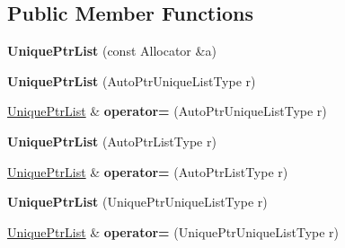 \subsection*{Public Member Functions}
\begin{DoxyCompactItemize}
\item 
\hypertarget{classcore_1_1container_1_1_unique_ptr_list_af3d18e1eafbccc21193aff3a68156da0}{{\bfseries Unique\-Ptr\-List} (const Allocator \&a)}\label{classcore_1_1container_1_1_unique_ptr_list_af3d18e1eafbccc21193aff3a68156da0}

\item 
\hypertarget{classcore_1_1container_1_1_unique_ptr_list_aa03ac532d98bb1c78ba2aa2689ce77e5}{{\bfseries Unique\-Ptr\-List} (Auto\-Ptr\-Unique\-List\-Type r)}\label{classcore_1_1container_1_1_unique_ptr_list_aa03ac532d98bb1c78ba2aa2689ce77e5}

\item 
\hypertarget{classcore_1_1container_1_1_unique_ptr_list_a58841c5438a0f43ba6cf94e84911be23}{\hyperlink{classcore_1_1container_1_1_unique_ptr_list}{Unique\-Ptr\-List} \& {\bfseries operator=} (Auto\-Ptr\-Unique\-List\-Type r)}\label{classcore_1_1container_1_1_unique_ptr_list_a58841c5438a0f43ba6cf94e84911be23}

\item 
\hypertarget{classcore_1_1container_1_1_unique_ptr_list_ace118e65e0fb3ab8847f5f22eb43e4c1}{{\bfseries Unique\-Ptr\-List} (Auto\-Ptr\-List\-Type r)}\label{classcore_1_1container_1_1_unique_ptr_list_ace118e65e0fb3ab8847f5f22eb43e4c1}

\item 
\hypertarget{classcore_1_1container_1_1_unique_ptr_list_a5e57ab0d14185d4cc6e004b3c829a4e7}{\hyperlink{classcore_1_1container_1_1_unique_ptr_list}{Unique\-Ptr\-List} \& {\bfseries operator=} (Auto\-Ptr\-List\-Type r)}\label{classcore_1_1container_1_1_unique_ptr_list_a5e57ab0d14185d4cc6e004b3c829a4e7}

\item 
\hypertarget{classcore_1_1container_1_1_unique_ptr_list_aa1594f0772a08d6d430a1b08992e385b}{{\bfseries Unique\-Ptr\-List} (Unique\-Ptr\-Unique\-List\-Type r)}\label{classcore_1_1container_1_1_unique_ptr_list_aa1594f0772a08d6d430a1b08992e385b}

\item 
\hypertarget{classcore_1_1container_1_1_unique_ptr_list_a29a1d4f32c1dd4daa89d5f48ea8b2b8a}{\hyperlink{classcore_1_1container_1_1_unique_ptr_list}{Unique\-Ptr\-List} \& {\bfseries operator=} (Unique\-Ptr\-Unique\-List\-Type r)}\label{classcore_1_1container_1_1_unique_ptr_list_a29a1d4f32c1dd4daa89d5f48ea8b2b8a}


\end{DoxyCompactItemize}
